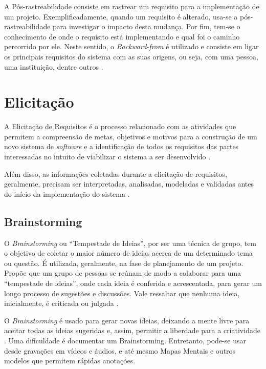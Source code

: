 A Pós-rastreabilidade consiste em rastrear um requisito para a implementação de um projeto. Exemplificadamente, quando um requisito é alterado, usa-se a pós-rastreabilidade para investigar o impacto desta mudança. Por fim, tem-se o conhecimento de onde o requisito está implementando e qual foi o caminho percorrido por ele. Neste sentido, o \textit{Backward-from} é utilizado e consiste em ligar os principais requisitos do sistema com as suas origens, ou seja, com uma pessoa, uma instituição, dentre outros \cite{pinheiro2004requirements}.

\section {Elicitação}

\label{sec:elicitacao}

A Elicitação de Requisitos é o processo relacionado com as atividades que permitem a compreensão de metas, objetivos e motivos para a construção de um novo sistema de \textit{software} e a identificação de todos os requisitos das partes interessadas no intuito de viabilizar o sistema a ser desenvolvido \cite{elliott2012software}.

Além disso, as informações coletadas durante a elicitação de requisitos, geralmente, precisam ser interpretadas, analisadas, modeladas e validadas antes do início da implementação do sistema \cite{nuseibeh2000requirements}.

\subsection{Brainstorming}

\label{sec:brainstorming}

O \textit{Brainstorming} ou “Tempestade de Ideias”, por ser uma técnica de grupo, tem o objetivo de coletar o maior número de ideias acerca de um determinado tema ou questão. É utilizada, geralmente, na fase de planejamento de um projeto. Propõe que um grupo de pessoas se reúnam de modo a colaborar para uma “tempestade de ideias”, onde cada ideia é conferida e acrescentada, para gerar um longo processo de sugestões e discussões. Vale ressaltar que nenhuma ideia, inicialmente, é criticada ou julgada \cite{mazzotti2012exploraccao}.

O \textit{Brainstorming} é usado para gerar novas ideias, deixando a mente livre para aceitar todas as ideias sugeridas e, assim, permitir a liberdade para a criatividade \cite{batista2003taxonomia}. Uma dificuldade é documentar um Brainstorming. Entretanto, pode-se usar desde gravações em vídeos e áudios, e até mesmo Mapas Mentais e outros modelos que permitem rápidas anotações.

